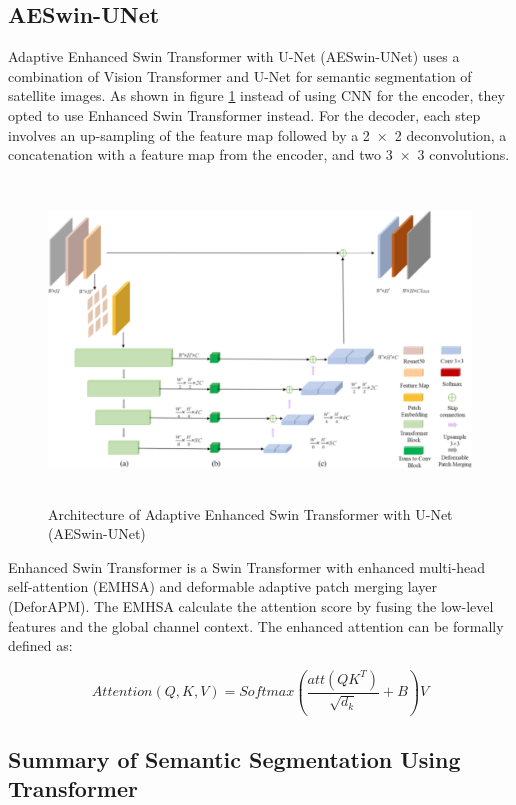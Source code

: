 \subsection{AESwin-UNet}
Adaptive Enhanced Swin Transformer with U-Net (AESwin-UNet) \cite{unet-transformer}  uses a combination of Vision Transformer and U-Net for semantic segmentation of satellite images. As shown in figure \ref{fig:unetswin} instead of using CNN for the encoder, they opted to use Enhanced Swin Transformer instead.  For the decoder, each step involves an up-sampling of the feature map followed by a 2 × 2 deconvolution, a concatenation with a feature map from the encoder, and two 3 × 3 convolutions. 

\FloatBarrier
\begin{figure}[ht]
\includegraphics[width=12.5cm, height=8.5cm]{images/unet-trasnformer.jpg}
\centering
\caption{Architecture of Adaptive Enhanced Swin Transformer with U-Net (AESwin-UNet) \protect\cite{unet-transformer}}
\label{fig:unetswin}
\end{figure}

Enhanced Swin Transformer is a Swin Transformer  with enhanced multi-head self-attention (EMHSA) and deformable adaptive patch merging layer (DeforAPM). The EMHSA calculate  the attention score by fusing the low-level features and the global channel context. The enhanced attention can be formally defined as:

\begin{equation}
    Attention(Q,K,V) = Softmax(\frac{att(QK^{T})}{\sqrt{d_k}}+B)V
\end{equation}

\subsection{Summary of Semantic Segmentation Using Transformer}

